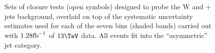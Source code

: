 \clearpage
\begin{figure}[h!]
  \begin{center}
     ~~
     \\
     ~~
     \\
    \caption{Sets of closure tests (open symbols) designed to probe
      the W and \ttbar + jets background, overlaid on top of
      the systematic uncertainty estimates used for each of the seven
      \scalht bins (shaded bands) carried out with $1.28\text{fb}^{-1}$ of
      $13\tev$ data. All events fit into the ``asymmetric'' jet
      category.}
    \label{fig:ttWclosureDataAsym}
  \end{center} 
\end{figure}

